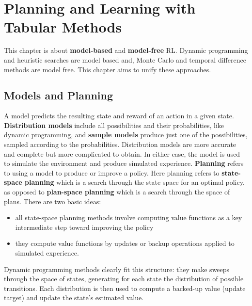 \documentclass[11pt]{article}
\begin{document}
\section{Planning and Learning with Tabular Methods}
\label{sec:org3b1f043}

This chapter is about \textbf{model-based} and \textbf{model-free} RL. Dynamic programming and
heuristic searches are model based and, Monte Carlo and temporal difference
methods are model free. This chapter aims to unify these approaches.

\subsection{Models and Planning}
\label{sec:orgb149da6}

A model predicts the resulting state and reward of an action in a given state.
\textbf{Distribution models} include all possibilities and their probabilities, like
dynamic programming, and \textbf{sample models} produce just one of the possibilities,
sampled according to the probabilities. Distribution models are more accurate
and complete but more complicated to obtain. In either case, the model is used
to simulate the environment and produce simulated experience. \textbf{Planning} refers
to using a model to produce or improve a policy. Here planning refers to
\textbf{state-space planning} which is a search through the state space for an optimal
policy, as opposed to \textbf{plan-space planning} which is a search through the space
of plans. There are two basic ideas:
\begin{itemize}
\item all state-space planning methods involve computing value functions as a
key intermediate step toward improving the policy
\item they compute value functions by updates or backup operations applied to
simulated experience.
\end{itemize}
Dynamic programming methods clearly fit this structure: they make sweeps through
the space of states, generating for each state the distribution of possible
transitions. Each distribution is then used to compute a backed-up value (update
target) and update the state’s estimated value.
\end{document}
